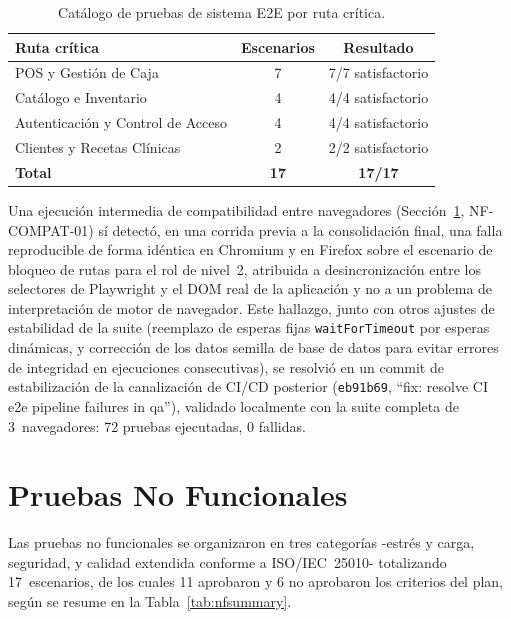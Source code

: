 \documentclass[conference]{IEEEtran}
\begin{document}
\begin{table}[htbp]
  \caption{Catálogo de pruebas de sistema E2E por ruta crítica.}
  \label{tab:e2e}
  \centering
  \footnotesize
  \begin{tabular}{p{3.4cm} c c}
    \toprule
    \textbf{Ruta crítica} & \textbf{Escenarios} & \textbf{Resultado} \\
    \midrule
    POS y Gestión de Caja & 7 & 7/7 satisfactorio \\
    Catálogo e Inventario & 4 & 4/4 satisfactorio \\
    Autenticación y Control de Acceso & 4 & 4/4 satisfactorio \\
    Clientes y Recetas Clínicas & 2 & 2/2 satisfactorio \\
    \midrule
    \textbf{Total} & \textbf{17} & \textbf{17/17} \\
    \bottomrule
  \end{tabular}
\end{table}

Una ejecución intermedia de compatibilidad entre navegadores (Sección~\ref{sec:nonfunctional}, NF-COMPAT-01) sí detectó, en una corrida previa a la consolidación final, una falla reproducible de forma idéntica en Chromium y en Firefox sobre el escenario de bloqueo de rutas para el rol de nivel~2, atribuida a desincronización entre los selectores de Playwright y el DOM real de la aplicación y no a un problema de interpretación de motor de navegador. Este hallazgo, junto con otros ajustes de estabilidad de la suite (reemplazo de esperas fijas \texttt{waitForTimeout} por esperas dinámicas, y corrección de los datos semilla de base de datos para evitar errores de integridad en ejecuciones consecutivas), se resolvió en un commit de estabilización de la canalización de CI/CD posterior (\texttt{eb91b69}, ``fix: resolve CI e2e pipeline failures in qa''), validado localmente con la suite completa de 3~navegadores: 72 pruebas ejecutadas, 0 fallidas.

\section{Pruebas No Funcionales}
\label{sec:nonfunctional}

Las pruebas no funcionales se organizaron en tres categorías -estrés y carga, seguridad, y calidad extendida conforme a ISO/IEC~25010- totalizando 17~escenarios, de los cuales 11 aprobaron y 6 no aprobaron los criterios del plan, según se resume en la Tabla~\ref{tab:nfsummary}.
\end{document}
